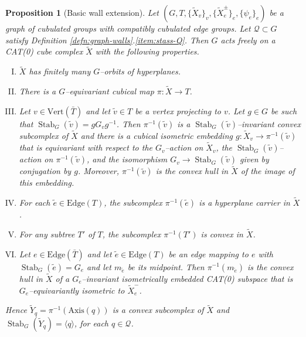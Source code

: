 \documentclass[11pt,oneside]{amsart}
\newcounter{ax}
\newtheorem{prop}[thm]{Proposition}
\theoremstyle{definition}
\DeclareMathOperator{\stabilizer}{Stab}
\newcommand{\vertices}{\mathrm{Vert}}
\newcommand{\edges}{\mathrm{Edge}}
\newcommand{\axis}{\mathrm{Axis}}
\begin{document}
\begin{prop}[Basic wall extension]\label{prop:joining-walls}
Let $(G,T,\{\widetilde X_v\}_v,\{\widetilde X_e^{\pm}\}_e,\{\psi_e\}_e)$ be a graph of cubulated groups with compatibly cubulated edge groups.  Let $\mathcal Q\subset G$ satisfy Definition \ref{defn:graph-walls}.\eqref{item:stass-Q}.  Then $G$ acts freely on a CAT(0) cube complex $\widetilde X$ with the following properties.
\begin{enumerate}[(I)] 
 \item \label{item:join-walls} $\widetilde X$ has finitely many $G$--orbits of hyperplanes.   

 \item \label{item:join-tree} There is a $G$--equivariant cubical map $\pi:\widetilde X\to T$.
 
 \item Let $v\in\vertices(\bar T)$ and let $\tilde v\in T$ be a vertex projecting to $v$.  Let $g\in G$ be such that $\stabilizer_G(\tilde v)=gG_vg^{-1}$.  Then $\pi^{-1}(\tilde v)$ is a $\stabilizer_G(\tilde v)$--invariant convex subcomplex of $\widetilde X$  and there is a cubical isometric embedding $g:\widetilde X_v\to \pi^{-1}(\tilde v)$ that is equivariant with respect to the $G_v$--action on $\widetilde X_v$, the $\stabilizer_G(\tilde v)$--action on $\pi^{-1}(\tilde v)$, and the isomorphism $G_v\to \stabilizer_G(\tilde v)$ given by conjugation by $g$.  Moreover, $\pi^{-1}(\tilde v)$ is the convex hull in $\widetilde X$ of the image of this embedding.\label{item:join-vertex-space}
 
 \item For each $\tilde e\in\edges(T)$, the subcomplex $\pi^{-1}(\tilde e)$ is a hyperplane carrier in $\widetilde X$.\label{item:join-hyperplane}
 
 \item \label{item:join-subtree} For any subtree $T'$ of $T$, the subcomplex $\pi^{-1}(T')$ is convex in $\widetilde X$.
 
 \item \label{item:join-edge-space} Let $e\in\edges(\bar T)$ and let $\tilde e\in\edges(T)$ be an edge mapping to $e$ with $\stabilizer_G(\tilde e)=G_e$ and let $m_{\tilde e}$ be its midpoint.  Then $\pi^{-1}(m_{\tilde e})$ is the convex hull in $\widetilde X$ of a $G_e$--invariant isometrically embedded CAT(0) subspace that is $G_e$--equivariantly isometric to $\widetilde X_e^-$.
 
\end{enumerate}
Hence $\widetilde Y_q=\pi^{-1}(\axis(q))$ is a convex subcomplex of $\widetilde X$ and $\stabilizer_G(\widetilde Y_q)=\langle q\rangle$, for each $q\in\mathcal Q$.  
\end{prop}
\end{document}
